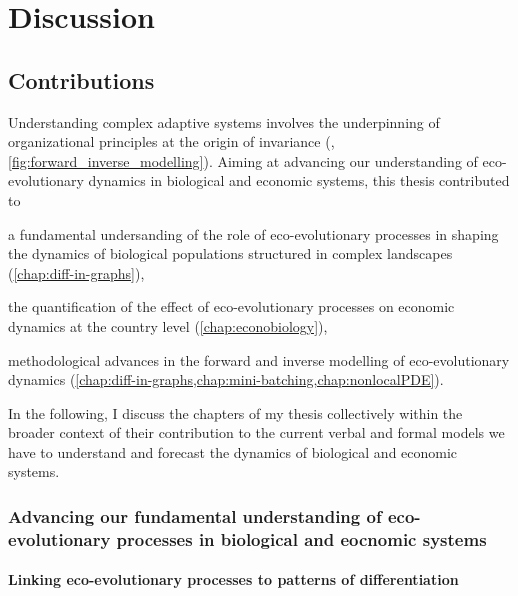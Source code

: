 
\graphicspath{{./content/conclusion/fig/}}

\chapter{Discussion}
\label{sec:conclusion}



\section{Contributions}
Understanding complex adaptive systems involves the underpinning of organizational principles at the origin of invariance (\cite{Levin2002}, \cref{fig:forward_inverse_modelling}).
% 
Aiming at advancing our understanding of eco-evolutionary dynamics in biological and economic systems, this thesis contributed to
% 
\begin{mylisti}
    \item a fundamental undersanding of the role of eco-evolutionary processes in shaping the dynamics of biological populations structured in complex landscapes (\cref{chap:diff-in-graphs}),
    \item the quantification of the effect of eco-evolutionary processes on economic dynamics at the country level (\cref{chap:econobiology}),
    \item methodological advances in the forward and inverse modelling of eco-evolutionary dynamics (\cref{chap:diff-in-graphs,chap:mini-batching,chap:nonlocalPDE}).
\end{mylisti}

In the following, I discuss the chapters of my thesis collectively within the broader context of their contribution to the current verbal and formal models we have to understand and forecast the dynamics of biological and economic systems.

\subsection{Advancing our fundamental understanding of eco-evolutionary processes in biological and eocnomic systems}

\subsubsection{Linking eco-evolutionary processes to patterns of differentiation}

